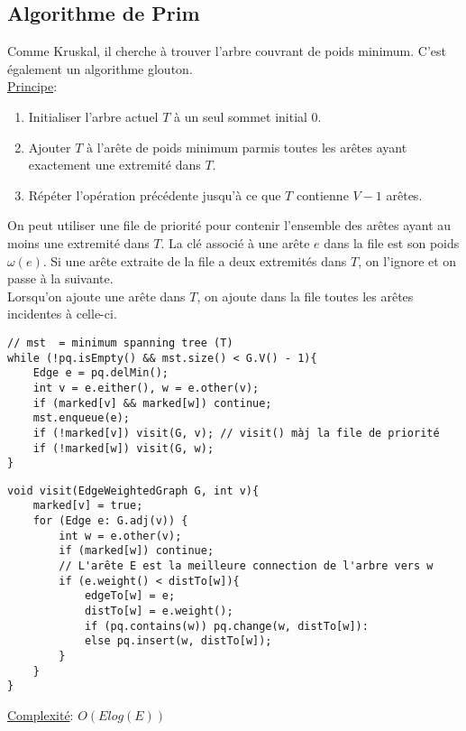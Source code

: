 \documentclass[10pt]{article}
\begin{document}
\subsection{Algorithme de Prim}
Comme Kruskal, il cherche à trouver l'arbre couvrant de poids minimum. C'est également un algorithme glouton.
\\\underline{Principe}:
\begin{enumerate}
\item Initialiser l'arbre actuel $T$ à un seul sommet initial 0.
\item Ajouter $T$ à l'arête de poids minimum parmis toutes les arêtes ayant exactement une extremité dans $T$.
\item Répéter l'opération précédente jusqu'à ce que $T$ contienne  $V - 1$ arêtes.
\end{enumerate}
On peut utiliser une file de priorité pour contenir l'ensemble des arêtes ayant au moins une extremité dans $T$.  La clé associé à une arête $e$ dans la file est son poids $\omega(e)$. Si une arête extraite de la file a deux extremités dans $T$, on l'ignore et on passe à la suivante. 
\\Lorsqu'on ajoute une arête dans $T$, on ajoute dans la file toutes les arêtes incidentes à celle-ci.
\begin{verbatim}
// mst  = minimum spanning tree (T)
while (!pq.isEmpty() && mst.size() < G.V() - 1){
	Edge e = pq.delMin();
	int v = e.either(), w = e.other(v);
	if (marked[v] && marked[w]) continue;
	mst.enqueue(e);
	if (!marked[v]) visit(G, v); // visit() màj la file de priorité
	if (!marked[w]) visit(G, w);
}
\end{verbatim}


\begin{verbatim}
void visit(EdgeWeightedGraph G, int v){
	marked[v] = true;
	for (Edge e: G.adj(v)) {
		int w = e.other(v);
		if (marked[w]) continue;
		// L'arête E est la meilleure connection de l'arbre vers w
		if (e.weight() < distTo[w]){ 
			edgeTo[w] = e;
			distTo[w] = e.weight();
			if (pq.contains(w)) pq.change(w, distTo[w]):
			else pq.insert(w, distTo[w]);				
		}
	}
}
\end{verbatim}

\underline{Complexité}: $O(Elog(E))$
\end{document}
